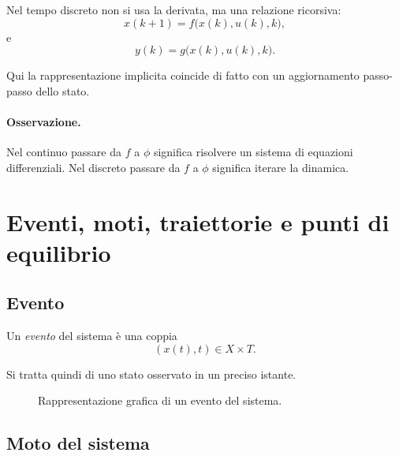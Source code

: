 Nel tempo discreto non si usa la derivata, ma una relazione ricorsiva:
\begin{equation}
x(k+1)=f\bigl(x(k),u(k),k\bigr),
\label{eq:L2_dt_state}
\end{equation}
e
\begin{equation}
y(k)=g\bigl(x(k),u(k),k\bigr).
\label{eq:L2_dt_output}
\end{equation}

Qui la rappresentazione implicita coincide di fatto con un aggiornamento passo-passo dello stato.

\paragraph{Osservazione.}
Nel continuo passare da $f$ a $\phi$ significa risolvere un sistema di equazioni differenziali.  
Nel discreto passare da $f$ a $\phi$ significa iterare la dinamica.

\section{Eventi, moti, traiettorie e punti di equilibrio}

\subsection{Evento}

Un \emph{evento} del sistema è una coppia
\[
(x(t),t)\in X\times T.
\]

Si tratta quindi di uno stato osservato in un preciso istante.

\begin{figure}[H]
\centering
{}
\caption{Rappresentazione grafica di un evento del sistema.}
\end{figure}

\subsection{Moto del sistema}

